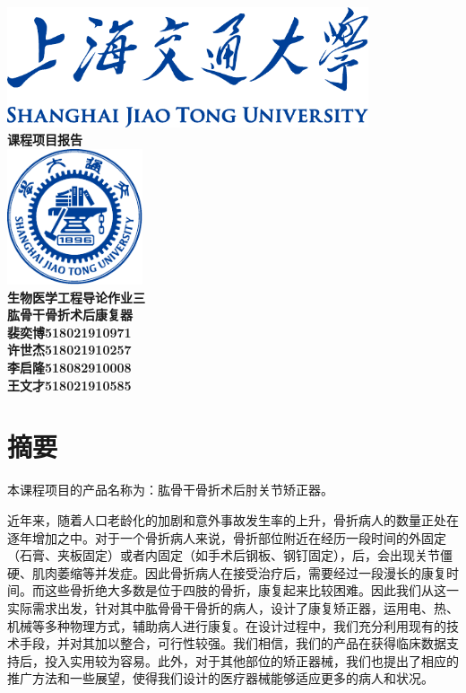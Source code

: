 \documentclass[UTF8]{ctexart}
\begin{document}
\begin{titlepage}
    \begin{center}
        \includegraphics[width=0.8\textwidth]{sjtu-name-blue.pdf}\\[1cm]
        \textsc{\huge \bfseries 课程项目报告}\\[1.5cm]
        \includegraphics[width=0.3\textwidth]{sjtu-badge-blue.pdf}\\[1cm]    
        \textsc{\huge \bfseries 生物医学工程导论作业三}\\[1.5cm]


        \Huge \bfseries{肱骨干骨折术后康复器}\\[1cm]
            
        \Large \bfseries{裴奕博518021910971\\许世杰518021910257\\李启隆518082910008\\王文才518021910585\\}

    \end{center}
\end{titlepage}


\section{摘要}
    本课程项目的产品名称为：肱骨干骨折术后肘关节矫正器。

    近年来，随着人口老龄化的加剧和意外事故发生率的上升，骨折病人的数量正处在逐年增加之中。对于一个骨折病人来说，骨折部位附近在经历一段时间的外固定（石膏、夹板固定）或者内固定（如手术后钢板、钢钉固定），后，会出现关节僵硬、肌肉萎缩等并发症。因此骨折病人在接受治疗后，需要经过一段漫长的康复时间。而这些骨折绝大多数是位于四肢的骨折，康复起来比较困难。因此我们从这一实际需求出发，针对其中肱骨骨干骨折的病人，设计了康复矫正器，运用电、热、机械等多种物理方式，辅助病人进行康复。在设计过程中，我们充分利用现有的技术手段，并对其加以整合，可行性较强。我们相信，我们的产品在获得临床数据支持后，投入实用较为容易。此外，对于其他部位的矫正器械，我们也提出了相应的推广方法和一些展望，使得我们设计的医疗器械能够适应更多的病人和状况。
\newpage
\end{document}
